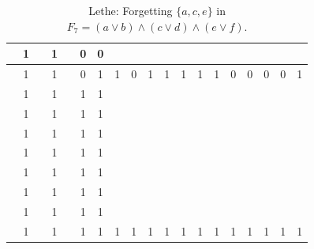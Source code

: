 \begin{table}[!tb]
\begin{tabular}{|c|c|c|c|c|c|c|c|c|c|c|c|c|c|c|c|c|c|c|}
        \rowcolor{blue!40}  & 1 &  & 1 &  & 0 & 0 &  &  &  &  &  &  &  &  &  &  &  &  \\ \hline
        \rowcolor{blue!40}  & 1 &  & 1 &  & 0 & 1 & 1 & 0 & 1 & 1 & 1 & 1 & 1 & 0 & 0 & 0 & 0 & 1 \\ \hline
        \rowcolor{red!40}  & 1 &  & 1 &  & 1 & 1 &  &  &  &  &  &  &  &  &  &  &  &  \\ \hline
        \rowcolor{red!40}  & 1 &  & 1 &  & 1 & 1 &  &  &  &  &  &  &  &  &  &  &  &  \\ \hline
        \rowcolor{red!40}  & 1 &  & 1 &  & 1 & 1 &  &  &  &  &  &  &  &  &  &  &  &  \\ \hline
        \rowcolor{red!40}  & 1 &  & 1 &  & 1 & 1 &  &  &  &  &  &  &  &  &  &  &  &  \\ \hline
        \rowcolor{red!40}  & 1 &  & 1 &  & 1 & 1 &  &  &  &  &  &  &  &  &  &  &  &  \\ \hline
        \rowcolor{red!40}  & 1 &  & 1 &  & 1 & 1 &  &  &  &  &  &  &  &  &  &  &  &  \\ \hline
        \rowcolor{red!40}  & 1 &  & 1 &  & 1 & 1 &  &  &  &  &  &  &  &  &  &  &  &  \\ \hline
        \rowcolor{red!40}  & 1 &  & 1 &  & 1 & 1 & 1 & 1 & 1 & 1 & 1 & 1 & 1 & 1 & 1 & 1 & 1 & 1 \\ \hline
    \end{tabular}
    \caption{Lethe: Forgetting $\{a, c, e\}$ in $F_{7} = (a \lor b) \land (c \lor d) \land (e \lor f)$.}
    \label{tab:lethe-F7-ace}
\end{table}
